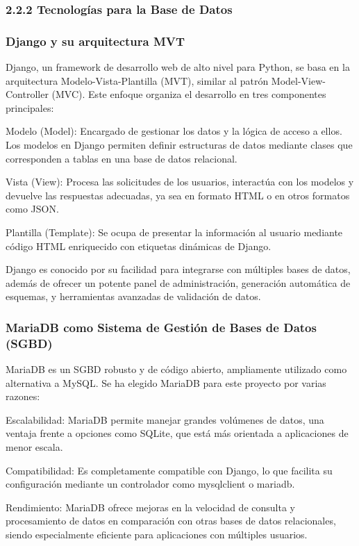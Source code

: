 \subsubsection{2.2.2 Tecnologías para la Base de Datos}

\subsubsection{Django y su arquitectura MVT}

Django, un framework de desarrollo web de alto nivel para Python, se basa en la arquitectura Modelo-Vista-Plantilla (MVT), similar al patrón Model-View-Controller (MVC). Este enfoque organiza el desarrollo en tres componentes principales:

Modelo (Model): Encargado de gestionar los datos y la lógica de acceso a ellos. Los modelos en Django permiten definir estructuras de datos mediante clases que corresponden a tablas en una base de datos relacional.

Vista (View): Procesa las solicitudes de los usuarios, interactúa con los modelos y devuelve las respuestas adecuadas, ya sea en formato HTML o en otros formatos como JSON.

Plantilla (Template): Se ocupa de presentar la información al usuario mediante código HTML enriquecido con etiquetas dinámicas de Django.

Django es conocido por su facilidad para integrarse con múltiples bases de datos, además de ofrecer un potente panel de administración, generación automática de esquemas, y herramientas avanzadas de validación de datos.

\subsubsection{MariaDB como Sistema de Gestión de Bases de Datos (SGBD)}
MariaDB es un SGBD robusto y de código abierto, ampliamente utilizado como alternativa a MySQL. Se ha elegido MariaDB para este proyecto por varias razones:

Escalabilidad: MariaDB permite manejar grandes volúmenes de datos, una ventaja frente a opciones como SQLite, que está más orientada a aplicaciones de menor escala.

Compatibilidad: Es completamente compatible con Django, lo que facilita su configuración mediante un controlador como mysqlclient o mariadb.

Rendimiento: MariaDB ofrece mejoras en la velocidad de consulta y procesamiento de datos en comparación con otras bases de datos relacionales, siendo especialmente eficiente para aplicaciones con múltiples usuarios.

